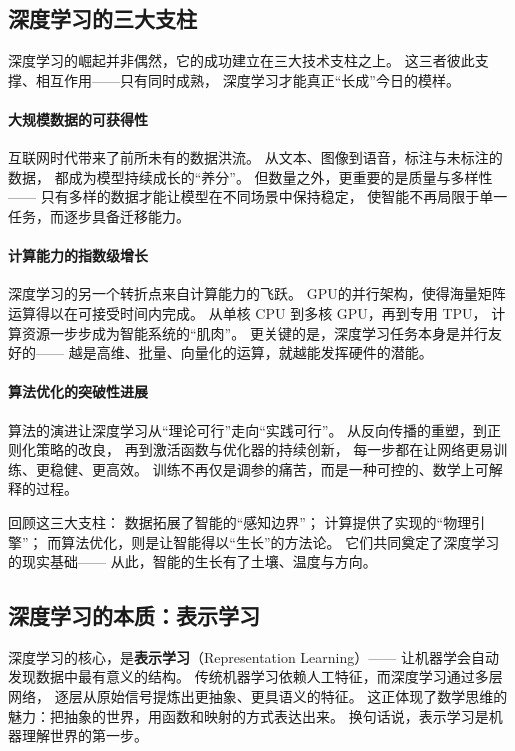 \subsection{深度学习的三大支柱}

深度学习的崛起并非偶然，它的成功建立在三大技术支柱之上。  
这三者彼此支撑、相互作用——只有同时成熟，  
深度学习才能真正“长成”今日的模样。

\paragraph{大规模数据的可获得性}  
互联网时代带来了前所未有的数据洪流。  
从文本、图像到语音，标注与未标注的数据，  
都成为模型持续成长的“养分”。  
但数量之外，更重要的是质量与多样性——  
只有多样的数据才能让模型在不同场景中保持稳定，  
使智能不再局限于单一任务，而逐步具备迁移能力。  

\paragraph{计算能力的指数级增长}  
深度学习的另一个转折点来自计算能力的飞跃。  
GPU的并行架构，使得海量矩阵运算得以在可接受时间内完成。  
从单核 CPU 到多核 GPU，再到专用 TPU，  
计算资源一步步成为智能系统的“肌肉”。  
更关键的是，深度学习任务本身是并行友好的——  
越是高维、批量、向量化的运算，就越能发挥硬件的潜能。  

\paragraph{算法优化的突破性进展}  
算法的演进让深度学习从“理论可行”走向“实践可行”。  
从反向传播的重塑，到正则化策略的改良，  
再到激活函数与优化器的持续创新，  
每一步都在让网络更易训练、更稳健、更高效。  
训练不再仅是调参的痛苦，而是一种可控的、数学上可解释的过程。  

回顾这三大支柱：  
数据拓展了智能的“感知边界”；  
计算提供了实现的“物理引擎”；  
而算法优化，则是让智能得以“生长”的方法论。  
它们共同奠定了深度学习的现实基础——  
从此，智能的生长有了土壤、温度与方向。

\subsection{深度学习的本质：表示学习}

深度学习的核心，是\textbf{表示学习}（Representation Learning）——  
让机器学会自动发现数据中最有意义的结构。  
传统机器学习依赖人工特征，而深度学习通过多层网络，  
逐层从原始信号提炼出更抽象、更具语义的特征。  
这正体现了数学思维的魅力：把抽象的世界，用函数和映射的方式表达出来。  
换句话说，表示学习是机器理解世界的第一步。  

